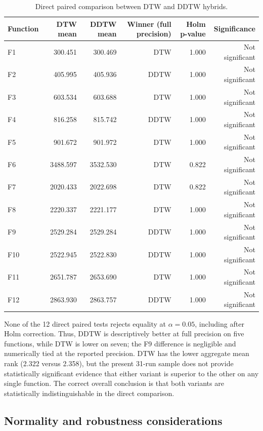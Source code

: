 \begin{table}[htbp]
\centering
\caption{Direct paired comparison between DTW and DDTW hybrids.}
\label{tab:cec2022-dtw-ddtw-direct-stats}
\scriptsize
\begin{tabular}{lrrrrr}
\toprule
Function & DTW mean & DDTW mean & Winner (full precision) & Holm p-value & Significance\\
\midrule
F1  & 300.451 & 300.469 & DTW  & 1.000 & Not significant\\
F2  & 405.995 & 405.936 & DDTW & 1.000 & Not significant\\
F3  & 603.534 & 603.688 & DTW  & 1.000 & Not significant\\
F4  & 816.258 & 815.742 & DDTW & 1.000 & Not significant\\
F5  & 901.672 & 901.972 & DTW  & 1.000 & Not significant\\
F6  & 3488.597 & 3532.530 & DTW  & 0.822 & Not significant\\
F7  & 2020.433 & 2022.698 & DTW  & 0.822 & Not significant\\
F8  & 2220.337 & 2221.177 & DTW  & 1.000 & Not significant\\
F9  & 2529.284 & 2529.284 & DDTW & 1.000 & Not significant\\
F10 & 2522.945 & 2522.830 & DDTW & 1.000 & Not significant\\
F11 & 2651.787 & 2653.690 & DTW  & 1.000 & Not significant\\
F12 & 2863.930 & 2863.757 & DDTW & 1.000 & Not significant\\
\bottomrule
\end{tabular}
\end{table}

None of the 12 direct paired tests rejects equality at $\alpha=0.05$, including
after Holm correction. Thus,
DDTW is descriptively better at full precision on five functions, while DTW is
lower on seven; the F9 difference is negligible and numerically tied at the
reported precision. DTW has the lower aggregate mean rank (2.322 versus
2.358), but the present 31-run sample does not provide statistically significant
evidence that either variant is superior to the other on any single function.
The correct overall conclusion is that both variants are statistically
indistinguishable in the direct comparison.

\subsection{Normality and robustness considerations}

